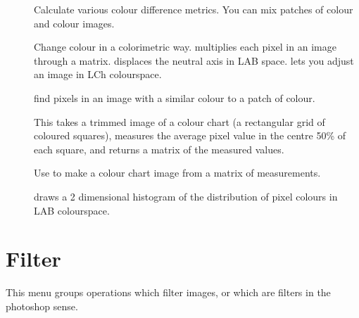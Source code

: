 \begin{description}
\item[]
	Calculate various colour difference metrics. You can mix patches of
	colour and colour images.

\item[]
	Change colour in a colorimetric way. 
	multiplies each pixel in an image through a matrix. 
	displaces the neutral axis in LAB space.  lets you adjust an
	image in LCh colourspace.

\item[]
	find pixels in an image with a similar colour to a patch of
	colour. 

\item[]
	This takes a trimmed image of a colour chart (a rectangular grid of
	coloured squares), measures the average pixel value in the centre 50\%
	of each square, and returns a matrix of the measured values. 

	Use  to make a colour chart image from
	a matrix of measurements. 

\item[]
	draws a 2 dimensional histogram of the distribution of pixel colours
	in LAB colourspace.

\end{description}

\section{Filter}

This menu groups operations which filter images, or which are filters in the
photoshop sense.

